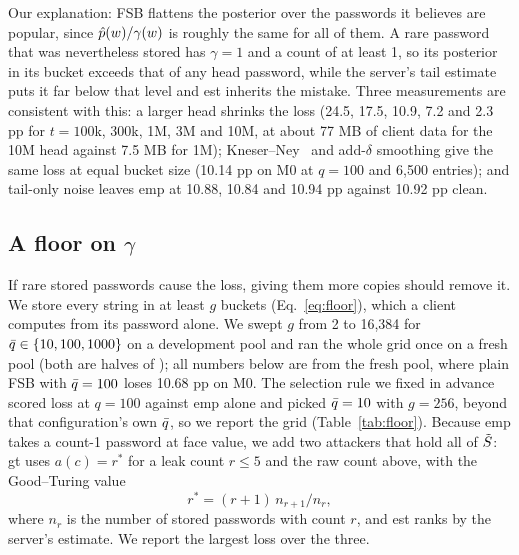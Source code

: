 Our explanation: FSB flattens the posterior over the passwords it believes are popular, since $\hat p(w)/\gamma(w)$ is roughly the same for all of them. A rare password that was nevertheless stored has $\gamma=1$ and a count of at least 1, so its posterior in its bucket exceeds that of any head password, while the server's tail estimate puts it far below that level and est inherits the mistake. Three measurements are consistent with this: a larger head shrinks the loss (24.5, 17.5, 10.9, 7.2 and 2.3 pp for $t=100$k, 300k, 1M, 3M and 10M, at about 77 MB of client data for the 10M head against 7.5 MB for 1M); Kneser--Ney~\cite{kneser1995} and add-$\delta$ smoothing give the same loss at equal bucket size (10.14 pp on M0 at $q=100$ and 6,500 entries); and tail-only noise leaves emp at 10.88, 10.84 and 10.94 pp against 10.92 pp clean.

\subsection{A floor on $\gamma$}\label{sec:floor}

If rare stored passwords cause the loss, giving them more copies should remove it. We store every string in at least $g$ buckets (Eq.~\eqref{eq:floor}), which a client computes from its password alone. We swept $g$ from 2 to 16,384 for $\bar q\in\{10,100,1000\}$ on a development pool and ran the whole grid once on a fresh pool (both are halves of \Atest); all numbers below are from the fresh pool, where plain FSB with $\bar q=100$ loses 10.68 pp on M0. The selection rule we fixed in advance scored loss at $q=100$ against emp alone and picked $\bar q=10$ with $g=256$, beyond that configuration's own $\bar q$, so we report the grid (Table~\ref{tab:floor}). Because emp takes a count-1 password at face value, we add two attackers that hold all of $\tilde S$: gt uses $a(c)=r^*$ for a leak count $r\le 5$ and the raw count above, with the Good--Turing value
\begin{equation}\label{eq:gt}
r^*=(r+1)\,n_{r+1}/n_r,
\end{equation}
where $n_r$ is the number of stored passwords with count $r$, and est ranks by the server's estimate. We report the largest loss over the three.

\begin{table}[t]
\centering
\caption{Worst-case loss over the emp, gt and est attackers at $q=\bar q$ (fresh pool): plain FSB and FSB with a floor $g$; sizes in parentheses are relative to plain FSB.}
\label{tab:floor}
\footnotesize
\setlength{\tabcolsep}{3pt}

\end{table}

